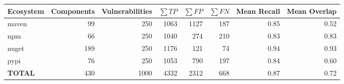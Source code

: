\begin{table}[!t]
\centering
\small
\begin{tabular}{lrrrrrrr}
\toprule
Ecosystem & Components & Vulnerabilities & $\sum TP$ & $\sum FP$ & $\sum FN$ & Mean Recall & Mean Overlap \\
\midrule
maven & 99 & 250 & 1063 & 1127 & 187 & 0.85 & 0.52 \\
npm & 66 & 250 & 1040 & 274 & 210 & 0.83 & 0.83 \\
nuget & 189 & 250 & 1176 & 121 & 74 & 0.94 & 0.93 \\
pypi & 76 & 250 & 1053 & 790 & 197 & 0.84 & 0.60 \\
\midrule
\textbf{TOTAL} & 430 & 1000 & 4332 & 2312 & 668 & 0.87 & 0.72 \\
\bottomrule
\end{tabular}
\end{table}
